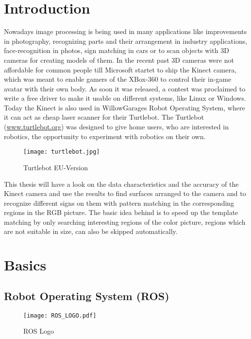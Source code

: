 \chapter{Introduction}
\graphicspath{{./Introduction/img/}}

Nowadays image processing is being used in many applications like improvements in
photography, recognizing parts and their arrangement in industry applications, 
face-recognition in photos, sign matching in cars or to scan objects with 
3D cameras for creating models of them. In the recent past 3D cameras were 
not affordable for common people till Microsoft startet to ship the Kinect 
camera, which was meant to enable gamers of the XBox-360 to control their in-game 
avatar with their own body. As soon it was released, a contest was proclaimed 
to write a free driver to make it usable on different systems, like Linux or Windows.
Today the Kinect is also used in WillowGarages Robot Operating System,
where it can act as cheap laser scanner for their Turtlebot. The Turtlebot 
(\url{www.turtlebot.org}) was designed to give home users, who are interested in 
robotics, the opportunity to experiment with robotics on their own.

\begin{figure}[htp]
\begin{center}
  \texttt{[image: turtlebot.jpg]}
  \caption{Turtlebot EU-Version}
  \label{figure:turtlebot}
\end{center}
\end{figure}

This thesis will have a look on the data characteristics and the accuracy of the
Kinect camera and use the results to find surfaces arranged to the camera and to 
recognize different signs on them with pattern matching in the corresponding regions
in the RGB picture. The basic idea behind is to speed up the template matching 
by only searching interesting regions of the color picture, regions which are not
suitable in size, can also be skipped automatically.

\chapter{Basics}

\section{Robot Operating System (ROS)}
  
\begin{figure}[htp]
	\centering
	\texttt{[image: ROS\_LOGO.pdf]}
	\caption{ROS Logo}
\end{figure} 

